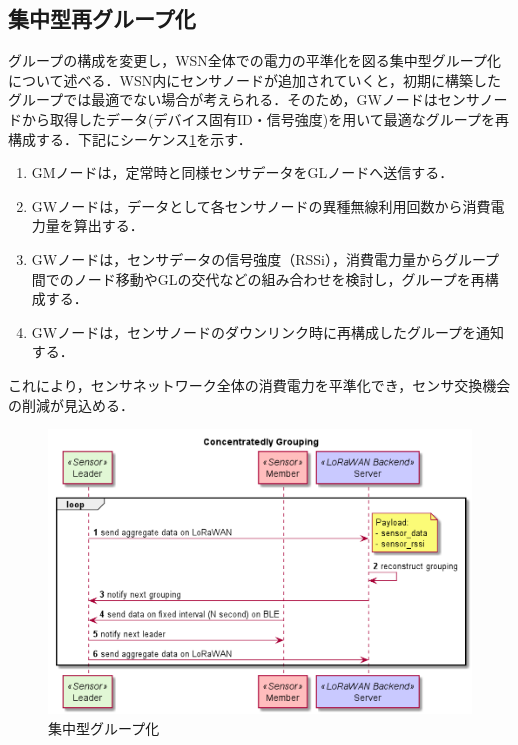 \subsection{集中型再グループ化}
グループの構成を変更し，WSN全体での電力の平準化を図る集中型グループ化について述べる．WSN内にセンサノードが追加されていくと，初期に構築したグループでは最適でない場合が考えられる．そのため，GWノードはセンサノードから取得したデータ(デバイス固有ID・信号強度)を用いて最適なグループを再構成する．下記にシーケンス\ref{fig:group_reconstruction_concentrately}を示す．

\begin{enumerate}
    \item GMノードは，定常時と同様センサデータをGLノードへ送信する．
    \item GWノードは，データとして各センサノードの異種無線利用回数から消費電力量を算出する．
    \item GWノードは，センサデータの信号強度（RSSi），消費電力量からグループ間でのノード移動やGLの交代などの組み合わせを検討し，グループを再構成する．
    \item GWノードは，センサノードのダウンリンク時に再構成したグループを通知する．
\end{enumerate}

これにより，センサネットワーク全体の消費電力を平準化でき，センサ交換機会の削減が見込める．

\begin{figure}[]
    \begin{center}
    \includegraphics[width=14cm]{figures/グループ化_集中的.png}
    \caption{集中型グループ化}
    \label{fig:group_reconstruction_concentrately}
    \end{center}
\end{figure}